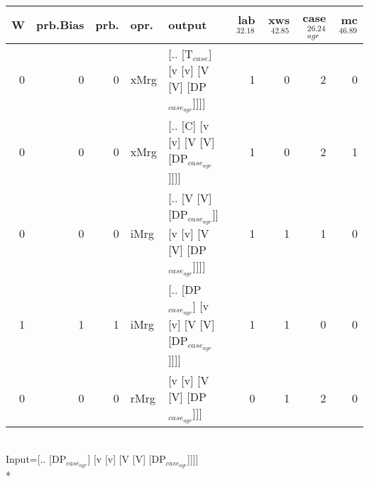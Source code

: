 \begin{tabularx}{\linewidth}{rrrlXrrrr}
\hline
   W &   prb.Bias &   prb. & opr.   & output                                                   &   lab$^{32.18}$ &   xws$^{42.85}$ &   case$_{agr}^{26.24}$ &   mc$^{46.89}$ \\
\hline
   0 &       0 &   0 & xMrg & [.. [T$_{case}$] [v [v] [V [V] [DP$_{case_{agr}}$]]]]              &             1 &             0 &                  2 &            0 \\
   0 &       0 &   0 & xMrg & [.. [C] [v [v] [V [V] [DP$_{case_{agr}}$]]]]                   &             1 &             0 &                  2 &            1 \\
   0 &       0 &   0 & iMrg & [.. [V [V] [DP$_{case_{agr}}$]] [v [v] [V [V] [DP$_{case_{agr}}$]]]] &             1 &             1 &                  1 &            0 \\
   1 &       1 &   1 & iMrg & [.. [DP$_{case_{agr}}$] [v [v] [V [V] [DP$_{case_{agr}}$]]]]         &             1 &             1 &                  0 &            0 \\
   0 &       0 &   0 & rMrg & [v [v] [V [V] [DP$_{case_{agr}}$]]]                            &             0 &             1 &                  2 &            0 \\
\hline
\end{tabularx}\endgroup\\
\begingroup\scriptsize Input=[.. [DP$_{case_{agr}}$] [v [v] [V [V] [DP$_{case_{agr}}$]]]]\\*
